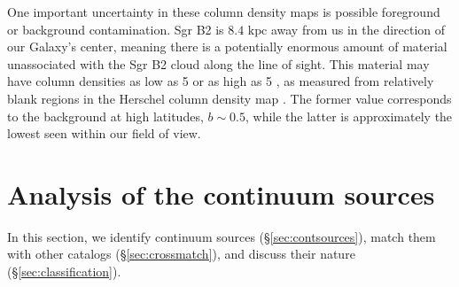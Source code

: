 \documentclass[twocolumn]{aastex61}
\newcommand{\dsgrb}{\ensuremath{8.4\textrm{~kpc}}\xspace}
\begin{document}
One important uncertainty in these column density maps is possible foreground
or background contamination.  Sgr B2 is \dsgrb away from us in the direction of
our Galaxy's center, meaning there is a potentially enormous amount of material
unassociated with the Sgr B2 cloud along the line of sight.  This material may
have column densities as low as 5 \persc or as high as 5 \persc,
as measured from relatively blank regions in the Herschel column density map
\citep[][and in prep]{Battersby2011a}.  The former value corresponds to the
background at high latitudes, $b\sim0.5$, while the latter  is approximately
the lowest seen within our field of view. 

\section{Analysis of the continuum sources}
\label{sec:analysis}
In this section, we identify continuum sources (\S \ref{sec:contsources}),
match them with other catalogs (\S \ref{sec:crossmatch}), and discuss
their nature (\S \ref{sec:classification}).
\end{document}
